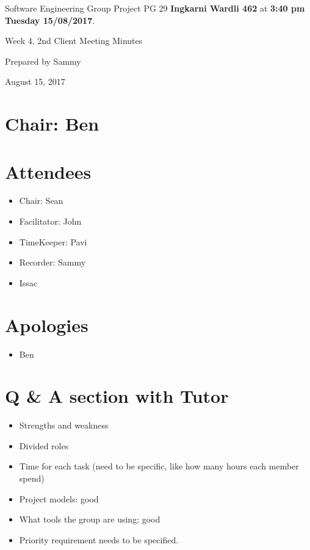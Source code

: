 \documentclass[11pt, a4paper]{article}
\begin{document}
\noindent Software Engineering Group Project PG 29 {\bf Ingkarni Wardli 462} at {\bf 3:40 pm Tuesday 15/08/2017}.
\vspace*{10pt}
\begin{center}
\huge Week 4, 2nd Client Meeting Minutes
\end{center}
\vspace*{10pt}
\begin{center}
\huge Prepared by Sammy
\end{center}
\begin{center}
\huge August 15, 2017
\end{center}
\section*{Chair: Ben}

\section{Attendees}
\begin{itemize}
\item Chair: Sean
\item Facilitator: John
\item TimeKeeper: Pavi
\item Recorder: Sammy
\item Issac
\end{itemize}



\section{Apologies}
\begin{itemize}
\item Ben
\end{itemize}


\section{Q \& A section with Tutor}
\begin{itemize}
\item Strengths and weakness
\item Divided roles
\item Time for each task (need to be specific, like how many hours each member spend)
\item Project models: good
\item What tools the group are using: good
\item Priority requirement needs to be specified.
\end{itemize}
\end{document}
